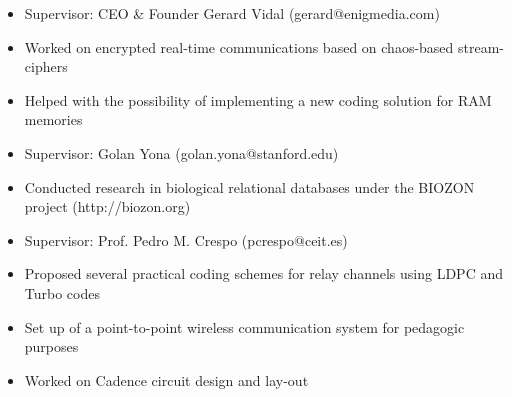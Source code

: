 \documentclass[11pt,a4paper,sans]{moderncv}        %
\begin{document}
\begin{itemize}
\item Supervisor: CEO \& Founder Gerard Vidal (gerard@enigmedia.com)
\item Worked on encrypted real-time communications based on chaos-based stream-ciphers
\end{itemize}
\vspace{10pt}

\begin{itemize}
\item Helped with the possibility of implementing a new coding solution for RAM memories
\end{itemize}
\vspace{10pt}

\begin{itemize}
\item Supervisor: Golan Yona (golan.yona@stanford.edu)
\item Conducted research in biological relational databases under the BIOZON project (http://biozon.org)
\end{itemize}
\vspace{10pt}


\begin{itemize}
\item Supervisor: Prof. Pedro M. Crespo (pcrespo@ceit.es)
\item Proposed several practical coding schemes for relay channels using LDPC and Turbo codes
\item  Set up of a point-to-point wireless communication system for pedagogic purposes
\end{itemize}
\vspace{10pt}

\begin{itemize}
\item Worked on Cadence circuit design and lay-out
\end{itemize}
\end{document}
